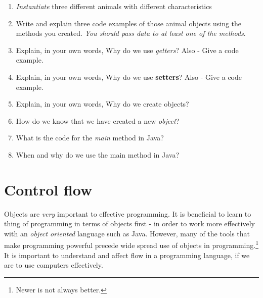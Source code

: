 \documentclass{article}
\begin{document}
\begin{flushleft}
\begin{enumerate}
\item \emph{Instantiate} three different animals with different characteristics

  \item Write and explain three code examples of those animal objects using the methods you created. \textit{You should pass data to at least one of the methods}.
  
\item Explain, in your own words, Why do we use \emph{getters}? Also - Give a code example.
  
\item Explain, in your own words, Why do we use \textbf{setters}? Also - Give a code example.

\item Explain, in your own words, Why do we create objects?

\item How do we know that we have created a new \emph{object}?

\item What is the code for the \emph{main} method in Java?

  \item When and why do we use the main method in Java?
  
\end{enumerate}


\newpage
\section{{\LARGE Control flow}}

Objects are \emph{very} important to effective programming. It is beneficial to learn to thing of programming in terms of objects first - in order to work more effectively with an \emph{object oriented} language such as Java. However, many of the tools that make programming powerful precede wide spread use of objects in programming.\footnote{Newer is not always better.} It is important to understand and affect flow in a programming language, if we are to use computers effectively.\par


\end{flushleft}
\end{document}
